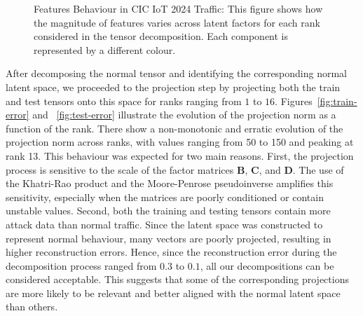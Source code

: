 \documentclass[preprint,12pt,authoryear]{elsarticle}
\begin{document}
\begin{figure}[H]
\caption{Features Behaviour in CIC IoT 2024 Traffic: This figure shows how the magnitude of features varies across latent factors for each rank considered in the tensor decomposition. Each component is represented by a different colour.}
\label{fig:ranks_evolution}
\end{figure}


\noindent After decomposing the normal tensor and identifying the corresponding normal latent space, we proceeded to the projection step by projecting both the train and test tensors onto this space for ranks ranging from $1$ to $16$. Figures~\ref{fig:train-error} and ~\ref{fig:test-error} illustrate the evolution of the projection norm as a function of the rank. There show a non-monotonic and erratic evolution of the projection norm across ranks, with values ranging from 50 to 150 and peaking at rank 13. This behaviour was expected for two main reasons. First, the projection process is sensitive to the scale of the factor matrices $\mathbf{B}$, $\mathbf{C}$, and $\mathbf{D}$. The use of the Khatri-Rao product and the Moore-Penrose pseudoinverse amplifies this sensitivity, especially when the matrices are poorly conditioned or contain unstable values. Second, both the training and testing tensors contain more attack data than normal traffic. Since the latent space was constructed to represent normal behaviour, many vectors are poorly projected, resulting in higher reconstruction errors. Hence, since the reconstruction error during the decomposition process ranged from $0.3$ to $0.1$, all our decompositions can be considered acceptable. This suggests that some of the corresponding projections are more likely to be relevant and better aligned with the normal latent space than others.
\end{document}
